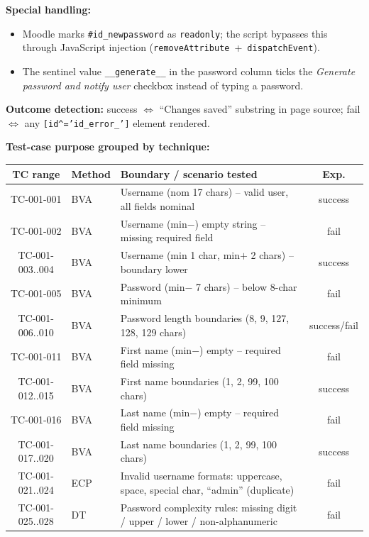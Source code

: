 \documentclass[twoside,final]{hcmut-report}
\begin{document}
\textbf{Special handling:}
\begin{itemize}
    \item Moodle marks \texttt{\#id\_newpassword} as \texttt{readonly}; the script bypasses this through JavaScript injection (\texttt{removeAttribute}~+~\texttt{dispatchEvent}).
    \item The sentinel value \texttt{\_\_generate\_\_} in the password column ticks the \emph{Generate password and notify user} checkbox instead of typing a password.
\end{itemize}
\textbf{Outcome detection:} success $\Leftrightarrow$ ``Changes saved'' substring in page source; fail $\Leftrightarrow$ any \texttt{[id\^{}='id\_error\_']} element rendered.

\textbf{Test-case purpose grouped by technique:}
\begin{table}[H]
\centering
\renewcommand{\arraystretch}{1.2}
\begin{tabularx}{\textwidth}{|c|l|X|c|}
\hline
\textbf{TC range} & \textbf{Method} & \textbf{Boundary / scenario tested} & \textbf{Exp.} \\ \hline
TC-001-001 & BVA & Username (nom 17 chars) -- valid user, all fields nominal & success \\ \hline
TC-001-002 & BVA & Username (min$-$) empty string -- missing required field & fail \\ \hline
TC-001-003..004 & BVA & Username (min 1 char, min$+$ 2 chars) -- boundary lower & success \\ \hline
TC-001-005 & BVA & Password (min$-$ 7 chars) -- below 8-char minimum & fail \\ \hline
TC-001-006..010 & BVA & Password length boundaries (8, 9, 127, 128, 129 chars) & success/fail \\ \hline
TC-001-011 & BVA & First name (min$-$) empty -- required field missing & fail \\ \hline
TC-001-012..015 & BVA & First name boundaries (1, 2, 99, 100 chars) & success \\ \hline
TC-001-016 & BVA & Last name (min$-$) empty -- required field missing & fail \\ \hline
TC-001-017..020 & BVA & Last name boundaries (1, 2, 99, 100 chars) & success \\ \hline
TC-001-021..024 & ECP & Invalid username formats: uppercase, space, special char, ``admin'' (duplicate) & fail \\ \hline
TC-001-025..028 & DT & Password complexity rules: missing digit / upper / lower / non-alphanumeric & fail \\ \hline

\end{tabularx}
\end{table}
\end{document}
